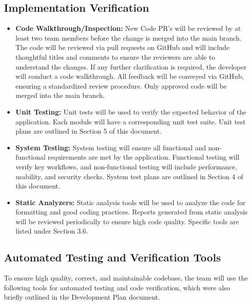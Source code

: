 \documentclass[12pt, titlepage]{article}
\begin{document}
\subsection{Implementation Verification}

\begin{itemize}
  \item \textbf{Code Walkthrough/Inspection:} 
  New Code PR’s will be reviewed by at least two team members before the change is merged into the main branch. 
  The code will be reviewed via pull requests on GitHub and will include thoughtful titles and comments to ensure the reviewers are able to understand the changes. 
  If any further clarification is required, the developer will conduct a code walkthrough. 
  All feedback will be conveyed via GitHub, ensuring a standardized review procedure. 
  Only approved code will be merged into the main branch.

  \item \textbf{Unit Testing:} 
  Unit tests will be used to verify the expected behavior of the application. 
  Each module will have a corresponding unit test suite. 
  Unit test plans are outlined in Section 5 of this document.

  \item \textbf{System Testing:} 
  System testing will ensure all functional and non-functional requirements are met by the application. 
  Functional testing will verify key workflows, and non-functional testing will include performance, usability, and security checks. 
  System test plans are outlined in Section 4 of this document.

  \item \textbf{Static Analyzers:} 
  Static analysis tools will be used to analyze the code for formatting and good coding practices. 
  Reports generated from static analysis will be reviewed periodically to ensure high code quality. 
  Specific tools are listed under Section 3.6.
\end{itemize}

\subsection{Automated Testing and Verification Tools}

To ensure high quality, correct, and maintainable codebase, the team will use the following tools for automated testing and code verification, which were also briefly outlined in the Development Plan document. \\ 
\end{document}
